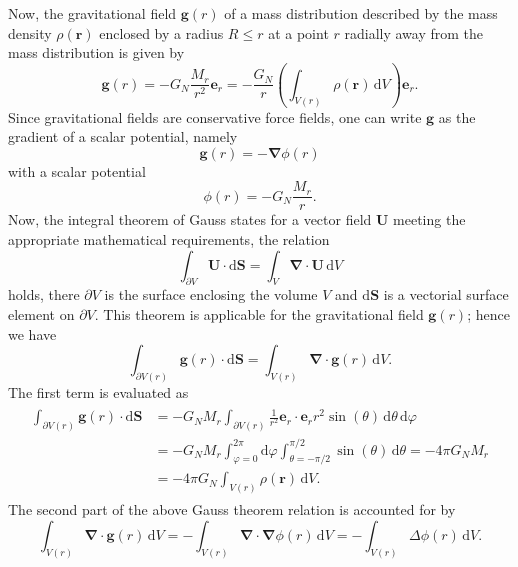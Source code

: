 \documentclass[a4paper,11pt]{article}
\numberwithin{equation}{section}
\newcommand\vect[1]{\ensuremath{\bm{#1}}}
\begin{document}
{Now, the gravitational field $\vect{g}(r)$ of a mass distribution described by the mass density $\rho(\vect{r})$ enclosed by a radius $R \leq r$ at a point $r$ radially away from the mass distribution is given by \begin{equation}
	\vect{g}(r) = -G_N\frac{M_r}{r^2}\vect{e}_r = -\frac{G_N}{r}\left(\int_{V(r)}\rho(\vect{r})\,\mathrm{d}V\right)\vect{e}_r.
\end{equation} Since gravitational fields are conservative force fields, one can write $\vect{g}$ as the gradient of a scalar potential, namely \begin{equation}
\vect{g}(r) = -\vect{\nabla}\phi(r)
\end{equation} with a scalar potential \begin{equation}
\phi(r) = -G_N\frac{M_r}{r}.
\end{equation} Now, the integral theorem of Gauss states for a vector field $\vect{U}$ meeting the appropriate mathematical requirements, the relation \begin{equation}
\int_{\partial V} \vect{U}\cdot \mathrm{d}\vect{S} = \int_{V} \vect{\nabla}\cdot \vect{U}\,\mathrm{d}V
\end{equation} holds, there $\partial V$ is the surface enclosing the volume $V$ and $\mathrm{d}\vect{S}$ is a vectorial surface element on $\partial V$. This theorem is applicable for the gravitational field $\vect{g}(r)$; hence we have \begin{equation}
\int_{\partial V(r)} \vect{g}(r)\cdot \mathrm{d}\vect{S} = \int_{V(r)} \vect{\nabla}\cdot \vect{g}(r)\,\mathrm{d}V.
\end{equation} The first term is evaluated as \begin{align}\begin{aligned}
\int_{\partial V(r)} \vect{g}(r)\cdot \mathrm{d}\vect{S} &= -G_NM_r\int_{\partial V(r)}\frac{1}{r^2}\vect{e}_r\cdot\vect{e}_rr^2\sin(\theta)\,\mathrm{d}\theta\,\mathrm{d}\varphi \\
&= -G_NM_r\int_{\varphi=0}^{2\pi}\mathrm{d}\varphi\int_{\theta=-\pi/2}^{\pi/2}\sin(\theta)\,\mathrm{d}\theta = -4\pi G_NM_r \\ &= -4\pi G_N \int_{V(r)} \rho(\vect{r})\,\mathrm{d}V .
\end{aligned}\end{align} The second part of the above Gauss theorem relation is accounted for by \begin{equation}
\int_{V(r)}\vect{\nabla}\cdot \vect{g}(r)\,\mathrm{d}V = -\int_{V(r)}\vect{\nabla}\cdot\vect{\nabla}\phi(r)\,\mathrm{d}V = -\int_{V(r)}\Delta \phi(r)\,\mathrm{d}V.

\end{equation}}
\end{document}
